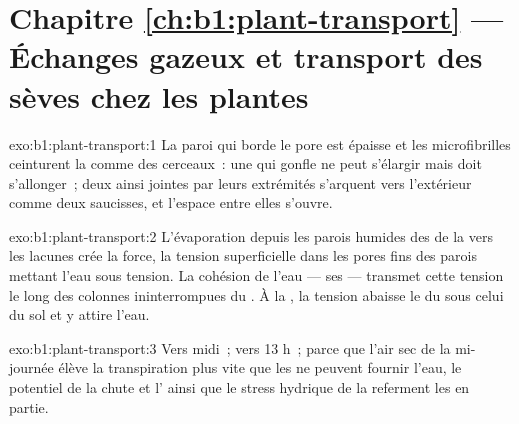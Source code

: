 \section*{Chapitre \ref{ch:b1:plant-transport} --- Échanges gazeux et transport des sèves chez les plantes}

\begin{solution}{exo:b1:plant-transport:1}
La paroi qui borde le pore est épaisse et les microfibrilles ceinturent
la  comme des cerceaux~: une  qui gonfle ne peut
s'élargir mais doit s'allonger~; deux  ainsi jointes par leurs
extrémités s'arquent vers l'extérieur comme deux saucisses, et l'espace
entre elles s'ouvre.
\end{solution}

\begin{solution}{exo:b1:plant-transport:2}
L'évaporation depuis les parois humides des  de la  vers
les lacunes crée la force, la tension superficielle dans les pores fins
des parois mettant l'eau sous tension. La cohésion de l'eau --- ses
 --- transmet cette tension le long des colonnes
ininterrompues du . À la , la tension abaisse le  du  sous celui du sol et y attire l'eau.
\end{solution}

\begin{solution}{exo:b1:plant-transport:3}
Vers midi~; vers 13 h~; parce que l'air sec de la mi-journée élève la
transpiration plus vite que les  ne peuvent fournir l'eau, le
potentiel de la  chute et l' ainsi que le
stress hydrique de la  referment les  en partie.
\end{solution}

